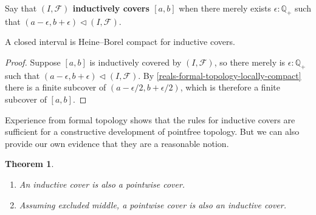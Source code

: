 \documentclass[10pt,a4paper]{article}
\providecommand{\index}[1]{}
\newcommand{\define}[1]{\textbf{#1}}
\newcommand{\pairr}[1]{{\mathopen{}(#1)\mathclose{}}}
\newcommand{\Q}{\ensuremath{\mathbb{Q}}\xspace}
\newcommand{\Qp}{\Q_{+}}
\newcommand{\cover}{\triangleleft} %
\newtheorem{thm}{Theorem}[section]
\theoremstyle{definition}
\theoremstyle{remark}
\numberwithin{equation}{section}
\begin{document}
Say that \define{$\pairr{I, \mathcal{F}}$ inductively covers
  $[a, b]$} when there merely exists $\epsilon : \Qp$ such that $(a - \epsilon, b +
\epsilon) \cover \pairr{I, \mathcal{F}}$.

\begin{cor} \label{interval-Heine-Borel}
  \index{compactness!Heine-Borel}%
  \index{interval!open and closed}%
  A closed interval is Heine--Borel compact for inductive covers.
\end{cor}

\begin{proof}
  Suppose $[a, b]$ is inductively covered by $\pairr{I, \mathcal{F}}$, so there merely is
  $\epsilon : \Qp$ such that $(a - \epsilon, b + \epsilon) \cover \pairr{I, \mathcal{F}}$.
  By \cref{reals-formal-topology-locally-compact} there is a finite subcover of
  $(a - \epsilon/2, b + \epsilon/2)$, which is therefore a finite subcover of $[a, b]$.
\end{proof}

Experience from formal topology\index{topology!formal} shows that the rules for inductive covers are sufficient
for a constructive development of pointfree topology. But we can also provide our own
evidence that they are a reasonable notion.

\begin{thm} \label{inductive-cover-classical}
  \mbox{}
  \begin{enumerate}
  \item An inductive cover is also a pointwise cover.
  \item Assuming excluded middle, a pointwise cover is also an inductive cover.
  \end{enumerate}
\end{thm}
\end{document}
